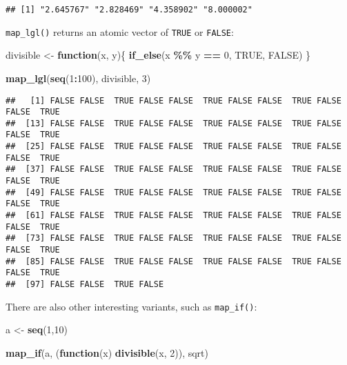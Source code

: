 \documentclass[
]{article}
\newenvironment{Shaded}{\begin{snugshade}}{\end{snugshade}}
\newcommand{\ControlFlowTok}[1]{\textcolor[rgb]{0.13,0.29,0.53}{\textbf{#1}}}
\newcommand{\DecValTok}[1]{\textcolor[rgb]{0.00,0.00,0.81}{#1}}
\newcommand{\KeywordTok}[1]{\textcolor[rgb]{0.13,0.29,0.53}{\textbf{#1}}}
\newcommand{\NormalTok}[1]{#1}
\newcommand{\OperatorTok}[1]{\textcolor[rgb]{0.81,0.36,0.00}{\textbf{#1}}}
\newcommand{\OtherTok}[1]{\textcolor[rgb]{0.56,0.35,0.01}{#1}}
\newcommand{\StringTok}[1]{\textcolor[rgb]{0.31,0.60,0.02}{#1}}
\begin{document}
\begin{verbatim}
## [1] "2.645767" "2.828469" "4.358902" "8.000002"
\end{verbatim}

\texttt{map\_lgl()} returns an atomic vector of \texttt{TRUE} or \texttt{FALSE}:

\begin{Shaded}
\begin{Highlighting}[]
\NormalTok{divisible \textless{}{-}}\StringTok{ }\ControlFlowTok{function}\NormalTok{(x, y)\{}
  \KeywordTok{if\_else}\NormalTok{(x }\OperatorTok{\%\%}\StringTok{ }\NormalTok{y }\OperatorTok{==}\StringTok{ }\DecValTok{0}\NormalTok{, }\OtherTok{TRUE}\NormalTok{, }\OtherTok{FALSE}\NormalTok{)}
\NormalTok{\}}

\KeywordTok{map\_lgl}\NormalTok{(}\KeywordTok{seq}\NormalTok{(}\DecValTok{1}\OperatorTok{:}\DecValTok{100}\NormalTok{), divisible, }\DecValTok{3}\NormalTok{)}
\end{Highlighting}
\end{Shaded}

\begin{verbatim}
##   [1] FALSE FALSE  TRUE FALSE FALSE  TRUE FALSE FALSE  TRUE FALSE FALSE  TRUE
##  [13] FALSE FALSE  TRUE FALSE FALSE  TRUE FALSE FALSE  TRUE FALSE FALSE  TRUE
##  [25] FALSE FALSE  TRUE FALSE FALSE  TRUE FALSE FALSE  TRUE FALSE FALSE  TRUE
##  [37] FALSE FALSE  TRUE FALSE FALSE  TRUE FALSE FALSE  TRUE FALSE FALSE  TRUE
##  [49] FALSE FALSE  TRUE FALSE FALSE  TRUE FALSE FALSE  TRUE FALSE FALSE  TRUE
##  [61] FALSE FALSE  TRUE FALSE FALSE  TRUE FALSE FALSE  TRUE FALSE FALSE  TRUE
##  [73] FALSE FALSE  TRUE FALSE FALSE  TRUE FALSE FALSE  TRUE FALSE FALSE  TRUE
##  [85] FALSE FALSE  TRUE FALSE FALSE  TRUE FALSE FALSE  TRUE FALSE FALSE  TRUE
##  [97] FALSE FALSE  TRUE FALSE
\end{verbatim}

There are also other interesting variants, such as \texttt{map\_if()}:

\begin{Shaded}
\begin{Highlighting}[]
\NormalTok{a \textless{}{-}}\StringTok{ }\KeywordTok{seq}\NormalTok{(}\DecValTok{1}\NormalTok{,}\DecValTok{10}\NormalTok{)}

\KeywordTok{map\_if}\NormalTok{(a, (}\ControlFlowTok{function}\NormalTok{(x) }\KeywordTok{divisible}\NormalTok{(x, }\DecValTok{2}\NormalTok{)), sqrt)}
\end{Highlighting}
\end{Shaded}
\end{document}
